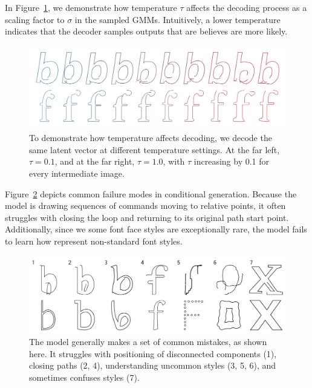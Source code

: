 In Figure~\ref{fig:temp}, we demonstrate how temperature $\tau$ affects the decoding process as a scaling factor to $\sigma$ in the sampled GMMs. Intuitively, a lower temperature indicates that the decoder samples outputs that are believes are more likely.
\begin{figure}[h]
    \centering
	\includegraphics[width=\textwidth]{figures/temp_grid}
    \caption[The temperature grid for a conditionally generated glyph]
    {To demonstrate how temperature affects decoding, we decode the same latent vector at different temperature settings.
    At the far left, $\tau=0.1$, and at the far right, $\tau=1.0$, with $\tau$ increasing by 0.1 for every intermediate image.\label{fig:temp}}
\end{figure}

Figure~\ref{fig:fails} depicts common failure modes in conditional generation.
Because the model is drawing sequences of commands moving to relative points, it often struggles with closing the loop and returning to its original path start point.
Additionally, since we some font face styles are exceptionally rare, the model fails to learn how represent non-standard font styles.
\begin{figure}[h]
    \centering
	\includegraphics[width=\textwidth]{figures/fails}
    \caption[Common failure cases for conditional generation]
    {The model generally makes a set of common mistakes, as shown here.
    It struggles with positioning of disconnected components (1), closing paths (2, 4), understanding uncommon styles (3, 5, 6), and sometimes confuses styles (7).\label{fig:fails}}
\end{figure}


